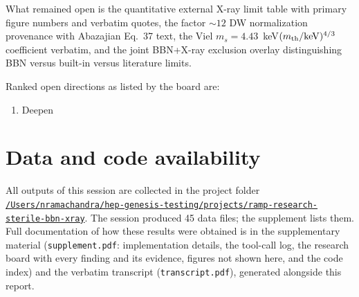 \documentclass[11pt,a4paper]{article}
\begin{document}
What remained open is the quantitative external X-ray limit table with primary figure numbers and verbatim quotes, the factor $\sim12$ DW normalization provenance with Abazajian Eq.~37 text, the Viel $m_{s}=4.43$~keV$(m_{\rm th}/{\rm keV})^{4/3}$ coefficient verbatim, and the joint BBN+X-ray exclusion overlay distinguishing BBN versus built-in versus literature limits.

Ranked open directions as listed by the board are:
\begin{enumerate}
\item Deepen
\end{enumerate}

\section*{Data and code availability}
All outputs of this session are collected in the project folder \href{file:///Users/nramachandra/hep-genesis-testing/projects/ramp-research-sterile-bbn-xray}{\texttt{/\allowbreak{}Users/\allowbreak{}nramachandra/\allowbreak{}hep-genesis-testing/\allowbreak{}projects/\allowbreak{}ramp-research-sterile-bbn-xray}}.
The session produced 45 data files; the supplement lists them.
Full documentation of how these results were obtained is in the supplementary material (\texttt{supplement.pdf}: implementation details, the tool-call log, the research board with every finding and its evidence, figures not shown here, and the code index) and the verbatim transcript (\texttt{transcript.pdf}), generated alongside this report.
\end{document}
